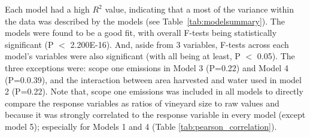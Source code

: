\documentclass[review,12pt,authoryear]{elsarticle}
\begin{document}
\begin{linenumbers}
Each model had a high $R^2$ value, indicating that a most of the variance within the data was described by the models (see Table~\ref{tab:modelsummary}). The models were found to be a good fit, with overall F-tests being statistically significant (P $<$ 2.200E-16). And, aside from 3 variables, F-tests across each model's variables were also significant (with all being at least, P $<$ 0.05). The three exceptions were: scope one emissions in Model 3 (P=0.22) and Model 4 (P=0.0.39), and the interaction between area harvested and water used in model 2 (P=0.22). Note that, scope one emissions was included in all models to directly compare the response variables as ratios of vineyard size to raw values and because it was strongly correlated to the response variable in every model (except model 5); especially for Models 1 and 4 (Table \ref{tab:pearson_correlation}). 
\par
\begin{table}[]
  \caption{Summary of models; their performance, F-statistics and Residual error.}\label{tab:modelsummary}
\end{table}
\end{linenumbers}
\end{document}
